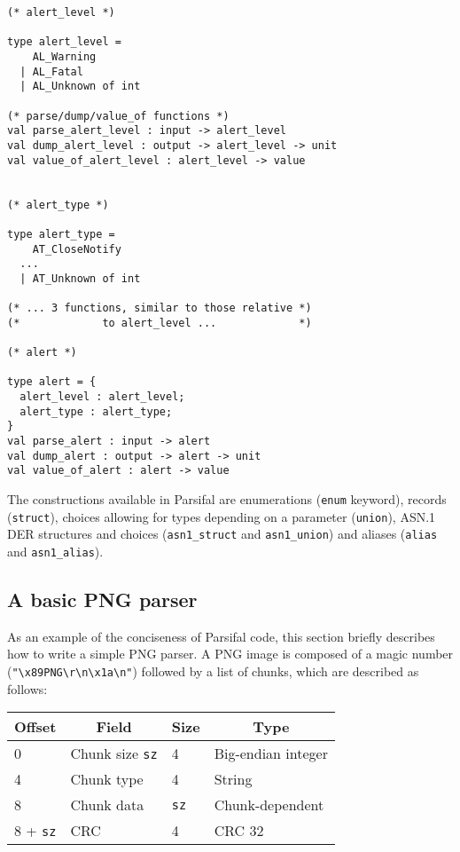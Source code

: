 \documentclass[conference]{IEEEtran}
\begin{document}
\begin{lstlisting}
(* alert_level *)

type alert_level =
    AL_Warning
  | AL_Fatal
  | AL_Unknown of int

(* parse/dump/value_of functions *)
val parse_alert_level : input -> alert_level
val dump_alert_level : output -> alert_level -> unit
val value_of_alert_level : alert_level -> value


(* alert_type *)

type alert_type =
    AT_CloseNotify
  ...
  | AT_Unknown of int

(* ... 3 functions, similar to those relative *)
(*             to alert_level ...             *)

(* alert *)

type alert = {
  alert_level : alert_level;
  alert_type : alert_type;
}
val parse_alert : input -> alert
val dump_alert : output -> alert -> unit
val value_of_alert : alert -> value
\end{lstlisting}


The constructions available in Parsifal are enumerations
(\texttt{enum} keyword), records (\texttt{struct}), choices allowing
for types depending on a parameter (\texttt{union}), ASN.1 DER
structures and choices (\texttt{asn1\_struct} and
\texttt{asn1\_union}) and aliases (\texttt{alias} and
\texttt{asn1\_alias}).


\subsection{A basic PNG parser}

As an example of the conciseness of Parsifal code, this section
briefly describes how to write a simple PNG parser. A PNG image is
composed of a magic number (\verb+"\x89PNG\r\n\x1a\n"+) followed by a
list of chunks, which are described as follows:

\begin{center}
  \begin{tabular}{|l|l|l|l|}
    \hline
    \multicolumn{1}{|c|}{\bf Offset} & \multicolumn{1}{c|}{\bf Field} &
    \multicolumn{1}{c|}{\bf Size} & \multicolumn{1}{c|}{\bf Type} \\
    \hline
    0 & Chunk size \texttt{sz} & 4 & Big-endian integer \\
    4 & Chunk type & 4 & String \\
    8 & Chunk data & \texttt{sz} & Chunk-dependent \\
    8 + \texttt{sz} & CRC & 4 & CRC 32 \\
    \hline
  \end{tabular}
\end{center}
\end{document}
